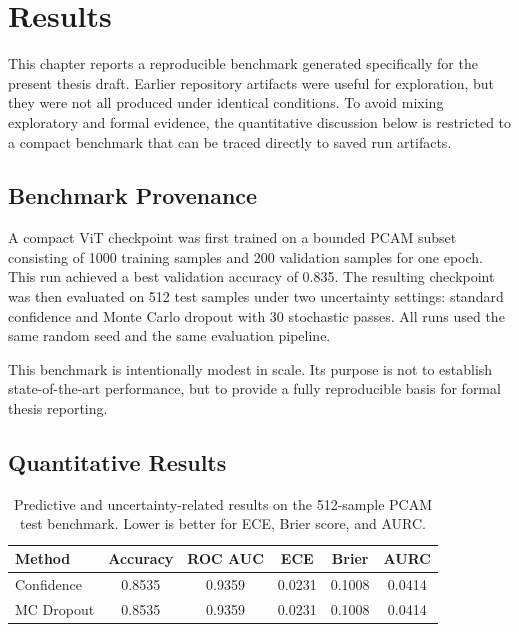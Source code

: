 \chapter{Results}
\label{chap:results}

This chapter reports a reproducible benchmark generated specifically for the present thesis draft. Earlier repository artifacts were useful for exploration, but they were not all produced under identical conditions. To avoid mixing exploratory and formal evidence, the quantitative discussion below is restricted to a compact benchmark that can be traced directly to saved run artifacts.

\section{Benchmark Provenance}

A compact ViT checkpoint was first trained on a bounded PCAM subset consisting of 1000 training samples and 200 validation samples for one epoch. This run achieved a best validation accuracy of 0.835. The resulting checkpoint was then evaluated on 512 test samples under two uncertainty settings: standard confidence and Monte Carlo dropout with 30 stochastic passes. All runs used the same random seed and the same evaluation pipeline.

This benchmark is intentionally modest in scale. Its purpose is not to establish state-of-the-art performance, but to provide a fully reproducible basis for formal thesis reporting.

\section{Quantitative Results}

\begin{table}[H]
    \centering
    \caption{Predictive and uncertainty-related results on the 512-sample PCAM test benchmark. Lower is better for ECE, Brier score, and AURC.}
    \label{tab:benchmark_results}
    \begin{tabular}{lccccc}
        \toprule
        Method & Accuracy & ROC AUC & ECE & Brier & AURC \\
        \midrule
        Confidence & 0.8535 & 0.9359 & 0.0231 & 0.1008 & 0.0414 \\
        MC Dropout & 0.8535 & 0.9359 & 0.0231 & 0.1008 & 0.0414 \\
        \bottomrule
    \end{tabular}
\end{table}

